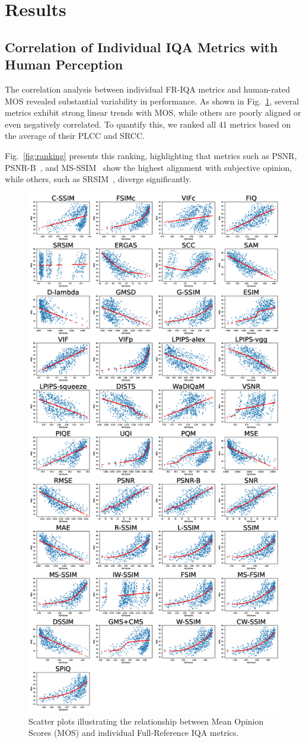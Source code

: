 \section{Results}

\subsection{Correlation of Individual IQA Metrics with Human Perception}

The correlation analysis between individual FR-IQA metrics and human-rated MOS revealed substantial variability in performance. As shown in Fig.~\ref{fig:mos_vs_iqa}, several metrics exhibit strong linear trends with MOS, while others are poorly aligned or even negatively correlated. To quantify this, we ranked all 41 metrics based on the average of their PLCC and SRCC.\@

Fig.~\ref{fig:ranking} presents this ranking, highlighting that metrics such as PSNR, PSNR-B~\cite{ma2011psnr}, and MS-SSIM~\cite{wang2003multiscale} show the highest alignment with subjective opinion, while others, such as SRSIM~\cite{wang2004image}, diverge significantly.


\begin{figure}
    \centering
    \includegraphics[width=0.7\linewidth]{images/mos_vs_iqa_grid.eps}
    \caption{Scatter plots illustrating the relationship between Mean Opinion Scores (MOS) and individual Full-Reference IQA metrics.}\label{fig:mos_vs_iqa}
\end{figure}

